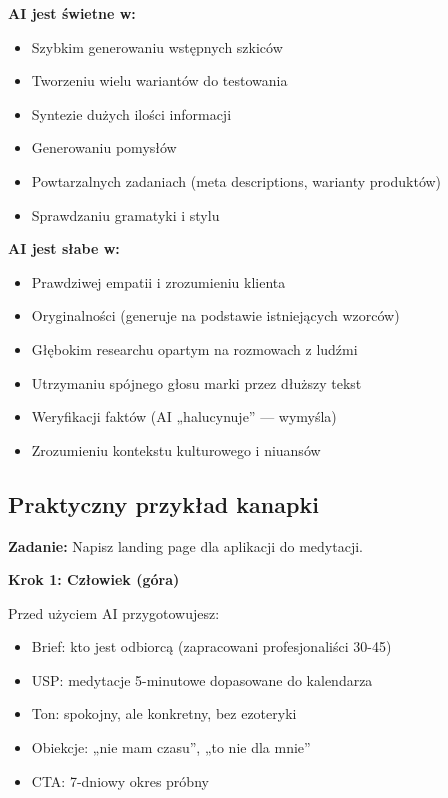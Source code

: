 \documentclass[
  12pt,
  a4paper,
  twoside,
  openright,
  12pt,
  DIV=12,
  BCOR=12mm]{scrbook}
\providecommand{\tightlist}{%
  \setlength{\itemsep}{0pt}\setlength{\parskip}{0pt}}\usepackage{longtable,booktabs,array}
\begin{document}
\textbf{AI jest świetne w:}

\begin{itemize}
\tightlist
\item
  Szybkim generowaniu wstępnych szkiców
\item
  Tworzeniu wielu wariantów do testowania
\item
  Syntezie dużych ilości informacji
\item
  Generowaniu pomysłów
\item
  Powtarzalnych zadaniach (meta descriptions, warianty produktów)
\item
  Sprawdzaniu gramatyki i stylu
\end{itemize}

\textbf{AI jest słabe w:}

\begin{itemize}
\tightlist
\item
  Prawdziwej empatii i zrozumieniu klienta
\item
  Oryginalności (generuje na podstawie istniejących wzorców)
\item
  Głębokim researchu opartym na rozmowach z ludźmi
\item
  Utrzymaniu spójnego głosu marki przez dłuższy tekst
\item
  Weryfikacji faktów (AI „halucynuje'' --- wymyśla)
\item
  Zrozumieniu kontekstu kulturowego i niuansów
\end{itemize}

\subsection{Praktyczny przykład
kanapki}\label{praktyczny-przykux142ad-kanapki}

\textbf{Zadanie:} Napisz landing page dla aplikacji do medytacji.

\textbf{Krok 1: Człowiek (góra)}

Przed użyciem AI przygotowujesz:

\begin{itemize}
\tightlist
\item
  Brief: kto jest odbiorcą (zapracowani profesjonaliści 30-45)
\item
  USP: medytacje 5-minutowe dopasowane do kalendarza
\item
  Ton: spokojny, ale konkretny, bez ezoteryki
\item
  Obiekcje: „nie mam czasu'', „to nie dla mnie''
\item
  CTA: 7-dniowy okres próbny
\end{itemize}
\end{document}

